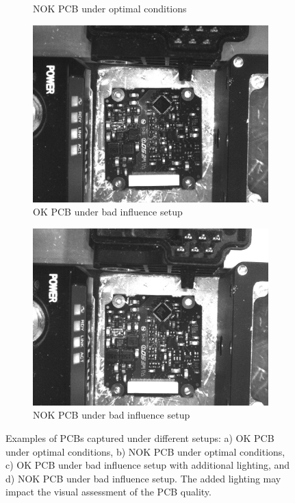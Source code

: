 \documentclass[12pt,DIV14,BCOR12mm,a4paper,footinclude=false,headinclude,parskip=half-,twoside,openright,cleardoublepage=empty,toc=index,bibliography=totoc,listof=totoc]{scrreprt}
\numberwithin{equation}{chapter}
\begin{document}
\begin{figure}
\begin{subfigure}[b]{0.45\textwidth}
        \caption{NOK PCB under optimal conditions}
        \label{fig:pcb_optimal_nok}
    \end{subfigure}
    \hfill
    \begin{subfigure}[b]{0.45\textwidth}
        \centering
        \includegraphics[scale=0.15]{../media/PCB-influence-OK.png}
        \caption{OK PCB under bad influence setup}
        \label{fig:pcb_bad_influence_ok}
    \end{subfigure}
    \hfill
    \begin{subfigure}[b]{0.45\textwidth}
        \centering
        \includegraphics[scale=0.15]{../media/PCB-influence-NOK.png}
        \caption{NOK PCB under bad influence setup}
        \label{fig:pcb_bad_influence_nok}
    \end{subfigure}
    \caption{Examples of PCBs captured under different setups: a) OK PCB under optimal conditions, b) NOK PCB under optimal conditions, c) OK PCB under bad influence setup with additional lighting, and d) NOK PCB under bad influence setup. The added lighting may impact the visual assessment of the PCB quality.}
    \label{fig:pcb_combined}
\end{figure}
\end{document}
